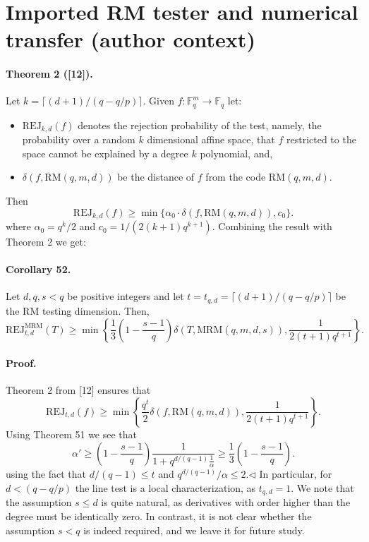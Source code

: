 \section*{Imported RM tester and numerical transfer (author context)}
\paragraph{Theorem 2 ([12]).} Let $k=\lceil(d+1)/(q-q/p)\rceil$. Given $f:\mathbb F_q^m\to\mathbb F_q$ let:
\begin{itemize}
\item $\mathrm{REJ}_{k,d}(f)$ denotes the rejection probability of the test, namely, the probability over a random $k$ dimensional affine space, that $f$ restricted to the space cannot be explained by a degree $k$ polynomial, and,
\item $\delta(f,\mathrm{RM}(q,m,d))$ be the distance of $f$ from the code $\mathrm{RM}(q,m,d)$.
\end{itemize}
Then
\[\mathrm{REJ}_{k,d}(f)\geq\min\{\alpha_0\cdot\delta(f,\mathrm{RM}(q,m,d)),c_0\}.\]
where $\alpha_0=q^k/2$ and $c_0=1/(2(k+1)q^{k+1})$.
Combining the result with Theorem 2 we get:
\paragraph{Corollary 52.} Let $d,q,s<q$ be positive integers and let $t=t_{q,d}=\lceil(d+1)/(q-q/p)\rceil$ be the RM testing dimension. Then,
\[\mathrm{REJ}_{t,d}^{\mathrm{MRM}}(T)\geq\min\left\{\frac13\left(1-\frac{s-1}q\right)\delta(T,\mathrm{MRM}(q,m,d,s)),\frac1{2(t+1)q^{t+1}}\right\}.\]
\paragraph{Proof.} Theorem 2 from [12] ensures that
\[\mathrm{REJ}_{t,d}(f)\geq\min\left\{\frac{q^t}2\delta(f,\mathrm{RM}(q,m,d)),\frac1{2(t+1)q^{t+1}}\right\}.\]
Using Theorem 51 we see that
\[\alpha'\geq\left(1-\frac{s-1}q\right)\frac1{1+q^{d/(q-1)}\frac1\alpha}\geq\frac13\left(1-\frac{s-1}q\right).\]
using the fact that $d/(q-1)\leq t$ and $q^{d/(q-1)}/\alpha\leq2$.\hfill$\triangleleft$
In particular, for $d<(q-q/p)$ the line test is a local characterization, as $t_{q,d}=1$.
We note that the assumption $s\leq d$ is quite natural, as derivatives with order higher than the degree must be identically zero. In contrast, it is not clear whether the assumption $s<q$ is indeed required, and we leave it for future study.
